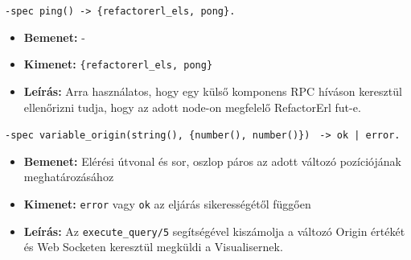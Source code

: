     
    
    \noindent \lstinline|-spec ping() -> {refactorerl_els, pong}.|
    \begin{itemize}
        \item \textbf{Bemenet:} -
        \item \textbf{Kimenet:} \lstinline|{refactorerl_els, pong}|
        \item \textbf{Leírás:} Arra használatos, hogy egy külső komponens RPC híváson keresztül ellenőrizni tudja, hogy az adott node-on megfelelő RefactorErl fut-e. 
    \end{itemize}
    
    
    \noindent \lstinline|-spec variable_origin(string(), {number(), number()})| \lstinline{ -> ok | error.}
    \begin{itemize}
        \item \textbf{Bemenet:} Elérési útvonal és sor, oszlop páros az adott változó pozíciójának meghatározásához
        \item \textbf{Kimenet:} \lstinline{error} vagy \lstinline{ok} az eljárás sikerességétől függően
        \item \textbf{Leírás:} Az \lstinline{execute_query/5} segítségével kiszámolja a változó Origin értékét és Web Socketen keresztül megküldi a Visualisernek.
    \end{itemize}
    
